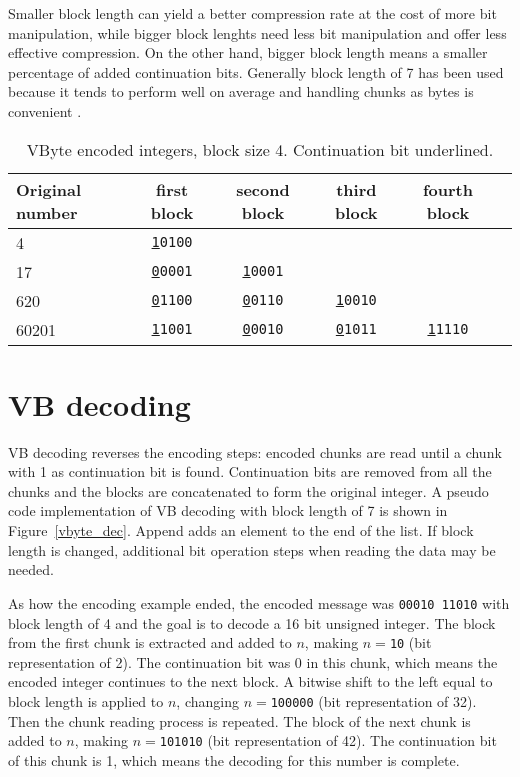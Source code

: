 Smaller block length can yield a better compression rate at the cost of more bit manipulation, while bigger block lenghts need less bit manipulation and 
offer less effective compression. On the other hand, bigger block length means a smaller percentage of added continuation bits.
Generally block length of 7 has been used because it tends to perform well on average and handling chunks as bytes is 
convenient \citep{Man08}.


\begin{table}
\centering
\begin{tabular}{l||c c c c c} 
Original number & first block & second block & third block & fourth block &\\ 
\hline \hline 
4  & \texttt{\underline{1}0100}    &                             &                           &  &  \\
17  & \texttt{\underline{0}0001}   & \texttt{\underline{1}0001}  &                           &  &  \\
620  & \texttt{\underline{0}1100}  & \texttt{\underline{0}0110} & \texttt{\underline{1}0010} &  &  \\
60201 & \texttt{\underline{1}1001} & \texttt{\underline{0}0010} & \texttt{\underline{0}1011} & \texttt{\underline{1}1110} &  \\

\hline
\end{tabular}
\caption{VByte encoded integers, block size 4. Continuation bit underlined.\label{table:vbytes}}
\end{table}

\section{VB decoding}
VB decoding reverses the encoding steps: encoded chunks are read until a chunk with 1 as continuation bit is found. Continuation bits 
are removed from all the chunks and the blocks are concatenated to form the original integer. A pseudo code implementation of VB decoding with block length of 7 is shown in Figure~\ref{vbyte_dec}.
Append adds an element to the end of the list. If block length is changed, additional bit operation steps when reading the data may be needed.

As how the encoding example ended, the encoded message was \texttt{00010 11010} with block length of 4 and the goal is to decode a 16 bit unsigned integer. The block from the first chunk is 
extracted and added to $n$, making $n = $\texttt{10} (bit representation of 2).
The continuation bit was 0 in this chunk, which means the encoded integer continues to the next block. A bitwise shift to the left equal to block length is applied to $n$, 
changing $n = $\texttt{100000} (bit representation of 32). Then the chunk reading process is repeated. The block of the next chunk is added to $n$, making 
$n = $\texttt{101010} (bit representation of 42). The continuation bit of this chunk is 1, which means the decoding for this number is complete. 

